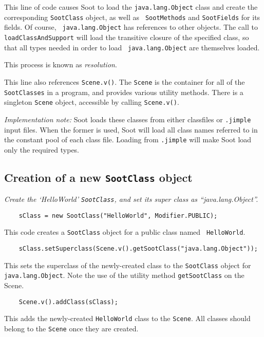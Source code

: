 \documentclass{article}
\begin{document}
This line of code causes Soot to load the {\tt java.lang.Object} class
and create the corresponding {\tt SootClass} object, as well as {\tt
SootMethods} and {\tt SootFields} for its fields.  Of course, {\tt
java.lang.Object} has references to other objects.  The call to {\tt
loadClassAndSupport} will load the transitive closure of the specified
class, so that all types needed in order to load {\tt
java.lang.Object} are themselves loaded.

This process is known as {\em resolution}.

This line also references {\tt Scene.v()}.  The {\tt Scene} is the
container for all of the {\tt SootClasses} in a program, and provides
various utility methods.  There is a singleton {\tt Scene} object,
accessible by calling {\tt Scene.v()}.

\noindent
{\em Implementation note:} Soot loads these classes from either
classfiles or {\tt .jimple} input files.  When the former is used,
Soot will load all class names referred to in the constant pool of
each class file.  Loading from {\tt .jimple} will make Soot load only
the required types.

\subsection{Creation of a new {\tt SootClass} object}

{\em Create the `HelloWorld' {\tt SootClass}, and set its super class
    as ``java.lang.Object''.}

\noindent
\begin{verbatim}    sClass = new SootClass("HelloWorld", Modifier.PUBLIC);\end{verbatim}

This code creates a {\tt SootClass} object for a public class named {\tt
HelloWorld}.

\noindent
\begin{verbatim}    sClass.setSuperclass(Scene.v().getSootClass("java.lang.Object"));\end{verbatim}

This sets the superclass of the newly-created class to the {\tt SootClass}
object for {\tt java.lang.Object}.  Note the use of the utility method
{\tt getSootClass} on the Scene.

\noindent
\begin{verbatim}    Scene.v().addClass(sClass); \end{verbatim}

This adds the newly-created {\tt HelloWorld} class to the {\tt Scene}.  All classes
should belong to the {\tt Scene} once they are created.
\end{document}
